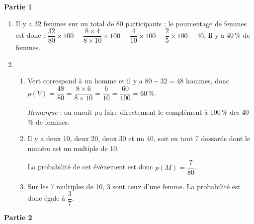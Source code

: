 
\medskip

\textbf{Partie 1}

\medskip

%
%
%

\begin{enumerate}
\item %
Il y a 32 femmes sur un total de 80 participants ; le pourcentage de femmes est donc : $\dfrac{32}{80} \times 100 = \dfrac{8 \times 4}{8 \times 10} \times 100 = \dfrac{4}{10} \times 100 = \dfrac{2}{5} \times 100 = 40$. Il y a 40\,\% de femmes.
\item %
	\begin{enumerate}
		\item %
Vert correspond à un homme et il y a $80 - 32 = 48$ hommes, donc $p(V) = \dfrac{48}{80} = \dfrac{8 \times 6}{8 \times 10} = \dfrac{6}{10} = \dfrac{60}{100} = 60\,\%$.

\emph{Remarque} : on aurait pu faire directement le complément à 100\,\% des 40\,\% de femmes.
		\item %
Il y a deux 10, deux 20, deux 30 et un 40, soit en tout 7 dossards dont le numéro est un multiple de 10.

La probabilité de cet évènement est donc $p(M) = \dfrac{7}{80}$.
		\item %
Sur les 7 multiples de 10, 3 sont ceux d'une femme. La probabilité est donc égale à $\dfrac{3}{7}$.
	\end{enumerate}
\end{enumerate}

\bigskip

\textbf{Partie 2}

